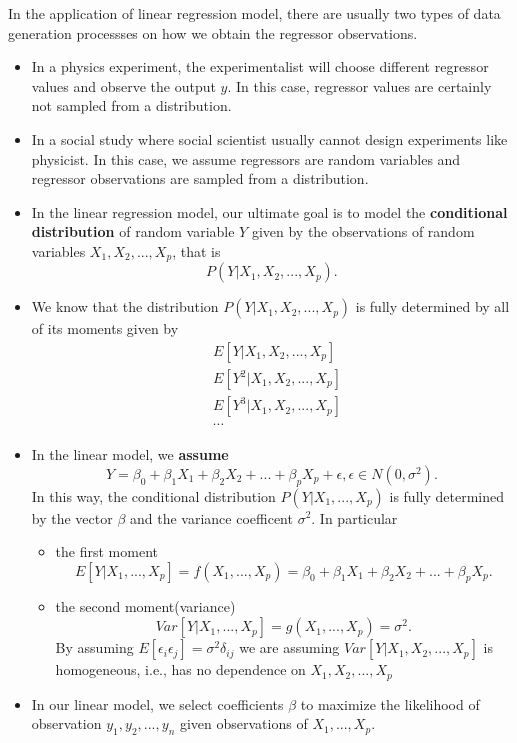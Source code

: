 \begin{refsection}
\begin{remark}\cite[25]{greene2017econometric}
In the application of linear regression model, there are usually two types of data generation processses on how we obtain the regressor observations.	
\begin{itemize}
	\item In a physics experiment, the experimentalist will choose different regressor values and observe the output $y$. In this case, regressor values are certainly not sampled from a distribution.
	\item In a social study where social scientist usually cannot design experiments like physicist. In this case, we assume regressors are random variables and regressor observations are sampled from a distribution.  
\end{itemize}
\end{remark}


\begin{note}\hfill
\begin{itemize}
	\item In the linear regression model, our ultimate goal is to model the \textbf{conditional distribution} of random variable $Y$ given by the observations of random variables $X_1,X_2,...,X_p$, that is
	$$P(Y|X_1,X_2,...,X_p).$$
	\item  We know that the distribution $P(Y|X_1,X_2,...,X_p)$ is fully determined by all of its moments given by
	\begin{align*}
	&E[Y|X_1,X_2,...,X_p] \\
	&E[Y^2|X_1,X_2,...,X_p] \\
	&E[Y^3|X_1,X_2,...,X_p] \\
	&\cdots
	\end{align*} 
	\item In the linear model, we \textbf{assume} 
	$$Y = \beta_0 + \beta_1 X_1 +\beta_2 X_2 + ... +\beta_{p} X_p + \epsilon, \epsilon \in N(0,\sigma^2).$$
	In this way, the conditional distribution $P(Y|X_1,...,X_p)$ is fully determined by the vector $\beta$ and the variance coefficent $\sigma^2$. 
	In particular
	\begin{itemize}
		\item the first moment
	$$E[Y|X_1,...,X_p] = f(X_1,...,X_p)=\beta_0 + \beta_1 X_1 +\beta_2 X_2 + ... +\beta_{p} X_p.$$ 
	\item the second moment(variance)
	$$Var[Y|X_1,...,X_p] = g(X_1,...,X_p) = \sigma^2.$$ 
		By assuming $E[\epsilon_i\epsilon_j]=\sigma^2\delta_{ij}$ we are assuming $Var[Y|X_1,X_2,...,X_p]$ is homogeneous, i.e., has no dependence on $X_1,X_2,...,X_p$
	\end{itemize} 
	\item In our linear model, we select coefficients $\beta$ to maximize the likelihood of observation $y_1,y_2,...,y_n$ given observations of $X_1,...,X_p$.
\end{itemize}	
\end{note}




\end{refsection}
